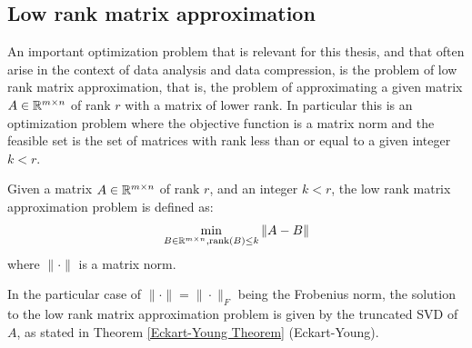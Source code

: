 \subsection{Low rank matrix approximation} \label{LRMA section}
An important optimization problem that is relevant for this thesis, and that often arise in the context of data analysis and data compression, is the problem of low rank matrix approximation, that is, the problem of approximating a given matrix $A \in \mathbb{R}^{m \times n}$ of rank $r$ with a matrix of lower rank.
In particular this is an optimization problem where the objective function is a matrix norm and the feasible set is the set of matrices with rank less than or equal to a given integer $k < r$.
\begin{definition}
    Given a matrix $A \in \mathbb{R}^{m \times n}$ of rank $r$, and an integer $k < r$, the low rank matrix approximation problem is defined as:
    \begin{equation}
        \min_{B \in \mathbb{R}^{m \times n}, \text{rank}(B) \leq k} \| A - B \|
    \end{equation}
    where $\| \cdot \|$ is a matrix norm.
\end{definition}
In the particular case of $\|\cdot\| = \|\cdot\|_F$ being the Frobenius norm, the solution to the low rank matrix approximation problem is given by the truncated SVD of $A$, as stated in Theorem \ref{Eckart-Young Theorem} (Eckart-Young).